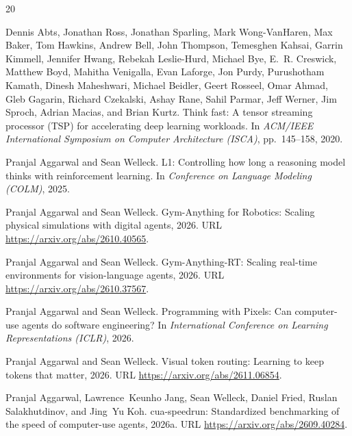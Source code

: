 \documentclass{article}
\begin{document}
\begin{thebibliography}{20}

Dennis Abts, Jonathan Ross, Jonathan Sparling, Mark Wong-VanHaren, Max Baker, Tom Hawkins, Andrew Bell, John Thompson, Temesghen Kahsai, Garrin Kimmell, Jennifer Hwang, Rebekah Leslie-Hurd, Michael Bye, E.~R. Creswick, Matthew Boyd, Mahitha Venigalla, Evan Laforge, Jon Purdy, Purushotham Kamath, Dinesh Maheshwari, Michael Beidler, Geert Rosseel, Omar Ahmad, Gleb Gagarin, Richard Czekalski, Ashay Rane, Sahil Parmar, Jeff Werner, Jim Sproch, Adrian Macias, and Brian Kurtz.
\newblock Think fast: A tensor streaming processor (TSP) for accelerating deep learning workloads.
\newblock In \emph{ACM/IEEE International Symposium on Computer Architecture (ISCA)}, pp.\ 145--158, 2020.

Pranjal Aggarwal and Sean Welleck.
\newblock L1: Controlling how long a reasoning model thinks with reinforcement learning.
\newblock In \emph{Conference on Language Modeling (COLM)}, 2025.

Pranjal Aggarwal and Sean Welleck.
\newblock Gym-Anything for Robotics: Scaling physical simulations with digital agents, 2026.
\newblock URL \url{https://arxiv.org/abs/2610.40565}.

Pranjal Aggarwal and Sean Welleck.
\newblock Gym-Anything-RT: Scaling real-time environments for vision-language agents, 2026.
\newblock URL \url{https://arxiv.org/abs/2610.37567}.

Pranjal Aggarwal and Sean Welleck.
\newblock Programming with Pixels: Can computer-use agents do software engineering?
\newblock In \emph{International Conference on Learning Representations (ICLR)}, 2026.

Pranjal Aggarwal and Sean Welleck.
\newblock Visual token routing: Learning to keep tokens that matter, 2026.
\newblock URL \url{https://arxiv.org/abs/2611.06854}.

Pranjal Aggarwal, Lawrence~Keunho Jang, Sean Welleck, Daniel Fried, Ruslan Salakhutdinov, and Jing~Yu Koh.
\newblock cua-speedrun: Standardized benchmarking of the speed of computer-use agents, 2026a.
\newblock URL \url{https://arxiv.org/abs/2609.40284}.


\end{thebibliography}
\end{document}
